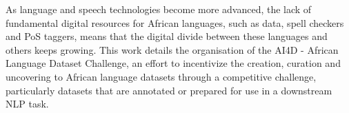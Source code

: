 As language and speech technologies become more advanced, the lack of fundamental digital resources for African languages, such as data, spell checkers and PoS taggers, means that the digital divide between these languages and others keeps growing. This work details the organisation of the AI4D - African Language Dataset Challenge, an effort to incentivize the creation, curation and uncovering to African language datasets through a competitive challenge, particularly datasets that are annotated or prepared for use in a downstream NLP task.
